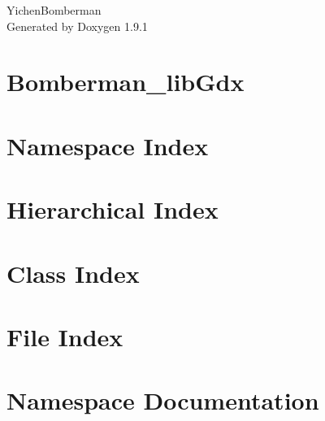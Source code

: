 \let\mypdfximage\pdfximage\def\pdfximage{\immediate\mypdfximage}\documentclass[twoside]{book}
\newcommand{\+}{\discretionary{\mbox{\scriptsize$\hookleftarrow$}}{}{}}
\newcommand{\clearemptydoublepage}{%
  \newpage{\pagestyle{empty}\cleardoublepage}%
}
\begin{document}
\raggedbottom

\hypersetup{pageanchor=false,
             bookmarksnumbered=true,
             pdfencoding=unicode
            }
\begin{titlepage}
\vspace*{7cm}
\begin{center}%
{\Large Yichen\+Bomberman }\\
\vspace*{1cm}
{\large Generated by Doxygen 1.9.1}\\
\end{center}
\end{titlepage}
\clearemptydoublepage
{}
\tableofcontents
\clearemptydoublepage
{}
\hypersetup{pageanchor=true}

\chapter{Bomberman\+\_\+lib\+Gdx}
\label{md__c___git_hub__bomberman_lib_gdx__r_e_a_d_m_e}

\chapter{Namespace Index}

\chapter{Hierarchical Index}

\chapter{Class Index}

\chapter{File Index}

\chapter{Namespace Documentation}










\end{document}
